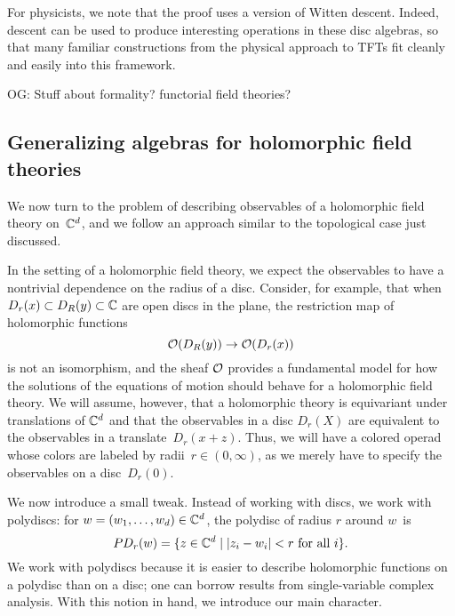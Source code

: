 \documentclass[11pt]{amsart}
\def\owen#1{{\textcolor{violet!65!black}{OG: {#1}}}}
\begin{document}
For physicists, we note that the proof uses a version of Witten descent.
Indeed, descent can be used to produce interesting operations in these disc algebras,
so that many familiar constructions from the physical approach to TFTs fit cleanly and easily into this framework.

\owen{Stuff about formality? functorial field theories?}

\subsection{Generalizing algebras for holomorphic field theories}

We now turn to the problem of describing observables of a holomorphic field theory on~$\mathbb C^d$,
and we follow an approach similar to the topological case just discussed.

In the setting of a holomorphic field theory, we expect the observables to have a nontrivial dependence on the radius of a disc.
Consider, for example, that 
when $D_r(x) \subset D_R(y) \subset \mathbb C$ are open discs in the plane,
the restriction map of holomorphic functions
\[
\mathcal O(D_R(y))\to \mathcal O(D_r(x))
\]
is not an isomorphism,
and the sheaf $\mathcal O$ provides a fundamental model for how the solutions of the equations of motion should behave for a holomorphic field theory.
We will assume, however, that a holomorphic theory is equivariant under translations of $\mathbb C^d$ and that the observables in a disc $D_r(X)$ are equivalent to the observables in a translate~$D_r(x+z)$.
Thus, we will have a colored operad whose colors are labeled by radii~$r \in (0,\infty)$,
as we merely have to specify the observables on a disc~$D_r(0)$.

We now introduce a small tweak.
Instead of working with discs, we work with polydiscs: for $w = (w_1, \ldots, w_d) \in \mathbb C^d$, the polydisc of radius $r$ around $w$~is
\[
PD_r(w) = \{ z \in \mathbb C^d \;|\; |z_i - w_i| < r \text{ for all $i$}\}.
\]
We work with polydiscs because it is easier to describe holomorphic functions on a polydisc than on a disc;
one can borrow results from single-variable complex analysis.
With this notion in hand, we introduce our main character.
\end{document}
